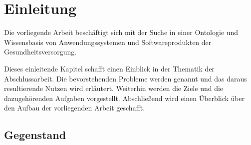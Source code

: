 \chapter{Einleitung}\label{ch:introduction}

Die vorliegende Arbeit beschäftigt sich mit der Suche in einer Ontologie und Wissensbasis von Anwendungssystemen und Softwareprodukten der Gesundheitsversorgung.

Dieses einleitende Kapitel schafft einen Einblick in der Thematik der Abschlussarbeit. 
Die bevorstehenden Probleme werden genannt und das daraus resultierende Nutzen wird erläutert. 
Weiterhin werden die Ziele und die dazugehörenden Aufgaben vorgestellt. 
Abschließend wird einen Überblick über den Aufbau der vorliegenden Arbeit geschafft.

\section{Gegenstand}\label{sec:gegenstand}





